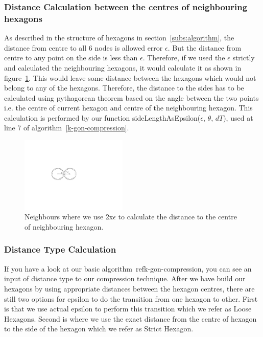 \documentclass[conference]{IEEEtran}
\begin{document}
\subsubsection{Distance Calculation between the centres of neighbouring hexagons}
As described in the structure of hexagons in section~\ref{subs:algorithm}, the distance from centre to all 6 nodes is allowed error $\epsilon$. But the distance from centre to any point on the side is less than $\epsilon$. Therefore, if we used the $\epsilon$ strictly and calculated the neighbouring hexagons, it would calculate it as shown in figure~\ref{fig:kgon-full-epslon}. This would leave some distance between the hexagons which would not belong to any of the hexagons. Therefore, the distance to the sides has to be calculated using pythagorean theorem based on the angle between the two points i.e. the centre of current hexagon and centre of the neighbouring hexagon. This calculation is performed by our function sideLengthAsEpsilon($\epsilon$, $\theta$, $dT$), used at line 7 of algorithm~\ref{k-gon-compression}.
\begin{figure}[ht]
  \centering
  \includegraphics[width=2in]{images/neighbours-double-epsilon.pdf}
  \caption {Neighbours where we use 2x$\epsilon$ to calculate the distance to the centre of neighbouring hexagon.}
  \label{fig:kgon-full-epslon}
\end{figure}
\subsubsection{Distance Type Calculation}
If you have a look at our basic algorithm~ref{k-gon-compression}, you can see an input of distance type to our compression technique. After we have build our hexagons by using appropriate distances between the hexagon centres, there are still two options for epsilon to do the transition from one hexagon to other. First is that we use actual epsilon to perform this transition which we refer as Loose Hexagons. Second is where we use the exact distance from the centre of hexagon to the side of the hexagon which we refer as Strict Hexagon.
\end{document}
